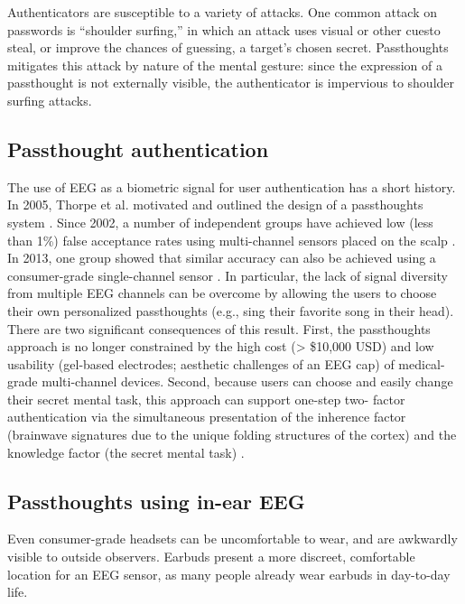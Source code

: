 \documentclass[sigconf]{acmart}
\begin{document}
Authenticators are susceptible to a variety of attacks. 
One common attack on passwords is ``shoulder surfing,'' in which an attack uses visual or other cuesto steal, or improve the chances of guessing, a target's chosen secret. 
Passthoughts mitigates this attack by nature of the mental gesture:
since the expression of a passthought is not externally visible, the authenticator is impervious to shoulder surfing attacks.

\subsection{Passthought authentication}
\label{sec:orga70a9dc}

The use of EEG as a biometric signal for user authentication has a short history.
In 2005, Thorpe et al. motivated and outlined the design of a passthoughts system \cite{Thorpe2005}. Since 2002, a number of independent groups have achieved low (less than 1\%) false acceptance rates using multi-channel sensors placed on the scalp \cite{Poulos2002,Marcel2007a,Palaniappan2008,Ashby2011}.
In 2013, one group showed that similar accuracy can also be
achieved using a consumer-grade single-channel sensor \cite{Chuang2013b}. 
In particular, the lack of signal diversity from multiple EEG channels can be overcome by allowing
the users to choose their own personalized passthoughts (e.g., sing their favorite
song in their head). There are two significant consequences of this result. First,
the passthoughts approach is no longer constrained by the high cost (> \$10,000 USD)
and low usability (gel-based electrodes; aesthetic challenges of an EEG cap) of
medical-grade multi-channel devices. Second, because users can choose and
easily change their secret mental task, this approach can support one-step two-
factor authentication via the simultaneous presentation of the inherence factor
(brainwave signatures due to the unique folding structures of the cortex) and the
knowledge factor (the secret mental task) \cite{Chuang2014}.

\subsection{Passthoughts using in-ear EEG}
\label{sec:orge2da838}

Even consumer-grade headsets can be uncomfortable to wear, and are awkwardly visible to outside observers. Earbuds present a more discreet, comfortable location for an EEG sensor, as many people already wear earbuds in day-to-day life.
\end{document}

